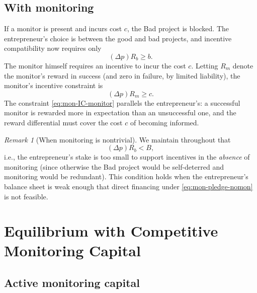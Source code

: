 \documentclass[11pt,a4paper,oneside]{book}
\def\geq{\geqslant}
\theoremstyle{plain}
\theoremstyle{definition}
\theoremstyle{remark}
\newtheorem{remark}[theorem]{Remark}
\numberwithin{equation}{chapter}
\begin{document}
\subsection{With monitoring}

If a monitor is present and incurs cost $c$, the Bad project is blocked.
The entrepreneur's choice is between the good and bad projects, and incentive compatibility now requires only
\begin{equation}\label{eq:mon-IC-mon}
  (\Delta p) R_b \geq b.
\end{equation}
The monitor himself requires an incentive to incur the cost $c$.
Letting $R_m$ denote the monitor's reward in success (and zero in failure, by limited liability), the monitor's incentive constraint is
\begin{equation}\label{eq:mon-IC-monitor}
  (\Delta p) R_m \geq c.
\end{equation}
The constraint \eqref{eq:mon-IC-monitor} parallels the entrepreneur's: a successful monitor is rewarded more in expectation than an unsuccessful one, and the reward differential must cover the cost $c$ of becoming informed.

\begin{remark}[When monitoring is nontrivial]\label{rem:mon-nontrivial}
We maintain throughout that
\begin{equation*}
  (\Delta p) R_b < B,
\end{equation*}
i.e., the entrepreneur's stake is too small to support incentives in the \emph{absence} of monitoring (since otherwise the Bad project would be self-deterred and monitoring would be redundant).
This condition holds when the entrepreneur's balance sheet is weak enough that direct financing under \eqref{eq:mon-pledge-nomon} is not feasible.
\end{remark}

\section{Equilibrium with Competitive Monitoring Capital}
\label{sec:mon-equilibrium}

\subsection{Active monitoring capital}
\end{document}
